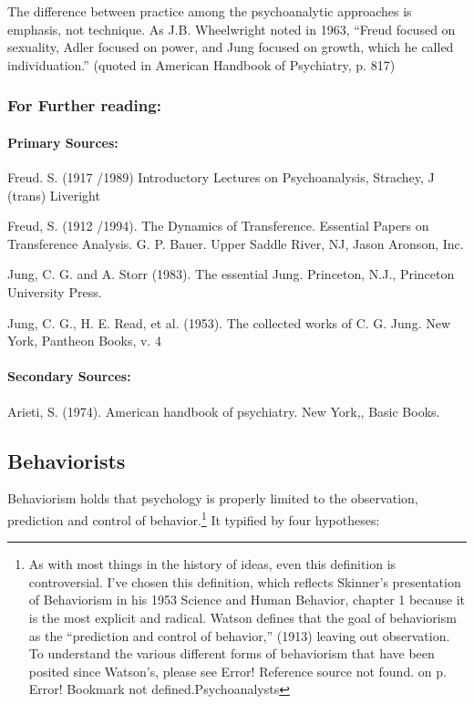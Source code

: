 The difference between practice among the psychoanalytic approaches is emphasis, not technique. As J.B. Wheelwright noted in 1963, “Freud focused on sexuality, Adler focused on power, and Jung focused on growth, which he called individuation.” (quoted in American Handbook of Psychiatry, p. 817)

\subsubsection{For Further reading:}
\label{forfurtherreading:}

\paragraph{Primary Sources:}
\label{primarysources:}

Freud. S. (1917 \slash  1989) Introductory Lectures on Psychoanalysis, Strachey, J (trans) Liveright

Freud, S. (1912 \slash  1994). The Dynamics of Transference. Essential Papers on Transference Analysis. G. P. Bauer. Upper Saddle River, NJ, Jason Aronson, Inc.

Jung, C. G. and A. Storr (1983). The essential Jung. Princeton, N.J., Princeton University Press.

Jung, C. G., H. E. Read, et al. (1953). The collected works of C. G. Jung. New York, Pantheon Books, v. 4

\paragraph{Secondary Sources:}
\label{secondarysources:}

Arieti, S. (1974). American handbook of psychiatry. New York,, Basic Books.

\subsection{Behaviorists}
\label{behaviorists}

Behaviorism holds that psychology is properly limited to the observation, prediction and control of behavior.\footnote{As with most things in the history of ideas, even this definition is controversial. I've chosen this definition, which reflects Skinner's presentation of Behaviorism in his 1953 Science and Human Behavior, chapter 1 because it is the most explicit and radical. Watson defines that the goal of behaviorism as the “prediction and control of behavior,” (1913) leaving out observation. To understand the various different forms of behaviorism that have been posited since Watson's, please see Error! Reference source not found. on p. Error! Bookmark not defined.Psychoanalysts} It typified by four hypotheses:

